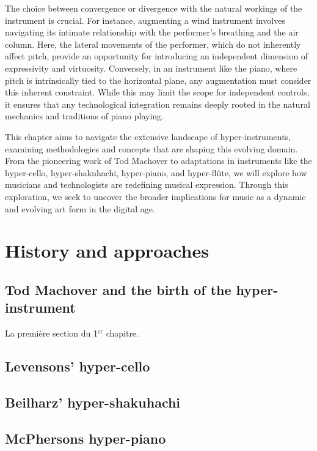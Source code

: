 \documentclass[12pt,twoside,maitrise]{dms}
\theoremstyle{definition}
\begin{document}
The choice between convergence or divergence with the natural workings of the instrument is crucial.
For instance, augmenting a wind instrument involves navigating its intimate relationship with the performer's breathing and the air column.
Here, the lateral movements of the performer, which do not inherently affect pitch, provide an opportunity for introducing an independent dimension of expressivity and virtuosity.
Conversely, in an instrument like the piano, where pitch is intrinsically tied to the horizontal plane, any augmentation must consider this inherent constraint.
While this may limit the scope for independent controls, it ensures that any technological integration remains deeply rooted in the natural mechanics and traditions of piano playing.

This chapter aims to navigate the extensive landscape of hyper-instruments, examining methodologies and concepts that are shaping this evolving domain.
From the pioneering work of Tod Machover to adaptations in instruments like the hyper-cello, hyper-shakuhachi, hyper-piano, and hyper-flûte, we will explore how musicians and technologists are redefining musical expression.
Through this exploration, we seek to uncover the broader implications for music as a dynamic and evolving art form in the digital age.

\section{History and approaches}

\subsection{Tod Machover and the birth of the hyper-instrument}

La premi\`ere section du 1$^{\text{er}}$ chapitre.

\subsection{Levensons' hyper-cello}

\subsection{Beilharz' hyper-shakuhachi}

\subsection{McPhersons hyper-piano}
\end{document}
